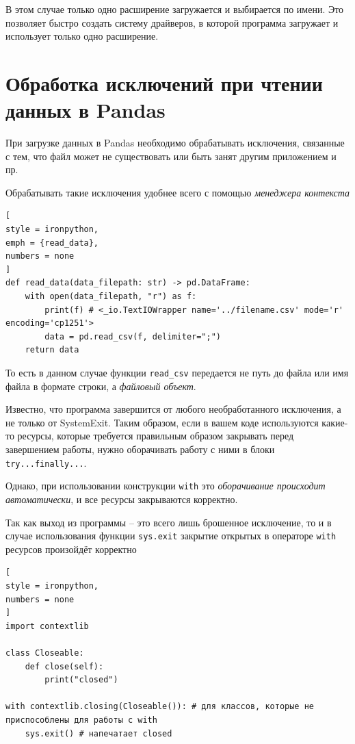 \documentclass[%
	11pt,
	a4paper,
	utf8,
		]{article}
\begin{document}
В этом случае только одно расширение загружается и выбирается по имени. Это позволяет быстро создать систему драйверов, в которой программа загружает и использует только одно расширение.

\section{Обработка исключений при чтении данных в Pandas}

При загрузке данных в Pandas необходимо обрабатывать исключения, связанные с тем, что файл может не существовать или быть занят другим приложением и пр.

Обрабатывать такие исключения удобнее всего с помощью \emph{менеджера контекста}
\begin{lstlisting}[
style = ironpython,
emph = {read_data},
numbers = none	
]
def read_data(data_filepath: str) -> pd.DataFrame:
    with open(data_filepath, "r") as f:
        print(f) # <_io.TextIOWrapper name='../filename.csv' mode='r' encoding='cp1251'>
        data = pd.read_csv(f, delimiter=";")
    return data
\end{lstlisting}

То есть в данном случае функции \texttt{read\_csv} передается не путь до файла или имя файла в формате строки, а \emph{файловый объект}.

Известно, что программа завершится от любого необработанного исключения, а не только от SystemExit. Таким образом, если в вашем коде используются какие-то ресурсы, которые требуется правильным образом закрывать перед завершением работы, нужно оборачивать работу с ними в блоки \texttt{try...finally...}.

Однако, при использовании конструкции \texttt{with} это \emph{оборачивание происходит автоматически}, и все ресурсы закрываются корректно.

Так как выход из программы -- это всего лишь брошенное исключение, то и в случае использования функции \texttt{sys.exit} закрытие открытых в операторе \texttt{with} ресурсов произойдёт корректно
\begin{lstlisting}[
style = ironpython,
numbers = none	
]
import contextlib

class Closeable:
    def close(self):
        print("closed")

with contextlib.closing(Closeable()): # для классов, которые не приспособлены для работы с with
    sys.exit() # напечатает closed
\end{lstlisting}
\end{document}
